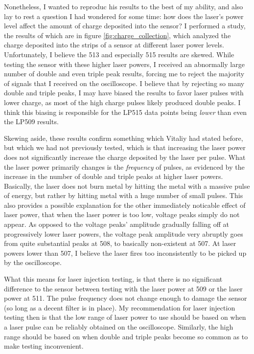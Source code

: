 \documentclass{report}
\begin{document}
            Nonetheless, I wanted to reproduc his results to the best of my ability, and also lay to rest a question I had wondered for some time: how does the laser's power level affect the amount of charge deposited into the sensor? I performed a study, the results of which are in figure \ref{fig:charge_collection}, which analyzed the charge deposited into the strips of a sensor at different laser power levels. Unfortunately, I believe the 513 and especially 515 results are skewed. While testing the sensor with these higher laser powers, I received an abnormally large number of double and even triple peak results, forcing me to reject the majority of signals that I received on the oscilloscope. I believe that by rejecting so many double and triple peaks, I may have biased the results to favor laser pulses with lower charge, as most of the high charge pulses likely produced double peaks. I think this biasing is responsible for the LP515 data points being \textit{lower} than even the LP509 results.

            Skewing aside, these results confirm something which Vitaliy had stated before, but which we had not previously tested, which is that increasing the laser power does not significantly increase the charge deposited by the laser per pulse. What the laser power primarily changes is the \textit{frequency} of pulses, as evidenced by the increase in the number of double and triple peaks at higher laser powers. Basically, the laser does not burn metal by hitting the metal with a massive pulse of energy, but rather by hitting metal with a huge number of small pulses. This also provides a possible explanation for the other immediately noticable effect of laser power, that when the laser power is too low, voltage peaks simply do not appear. As opposed to the voltage peaks' amplitude gradually falling off at progressively lower laser powers, the voltage peak amplitude very abruptly goes from quite substantial peaks at 508, to basically non-existent at 507. At laser powers lower than 507, I believe the laser fires too inconsistently to be picked up by the oscilloscope.
            
            What this means for laser injection testing, is that there is no significant difference to the sensor between testing with the laser power at 509 or the laser power at 511. The pulse frequency does not change enough to damage the sensor (so long as a decent filter is in place). My recommendation for laser injection testing then is that the low range of laser power to use should be based on when a laser pulse can be reliably obtained on the oscilloscope. Similarly, the high range should be based on when double and triple peaks become so common as to make testing inconvenient.

            
            


        
    
\end{document}
